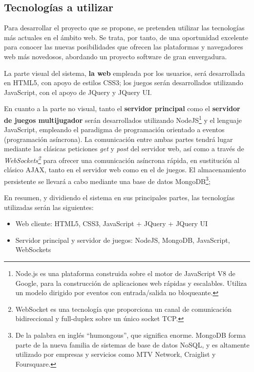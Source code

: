 \documentclass[12pt,a4paper]{article}
\begin{document}
\subsection{Tecnologías a utilizar}

Para desarrollar el proyecto que se propone, se pretenden utilizar las tecnologías más actuales en el ámbito web. Se trata, por tanto, de una oportunidad excelente para conocer las nuevas posibilidades que ofrecen las plataformas y navegadores web más novedosos, abordando un proyecto software de gran envergadura.

La parte visual del sistema, {\bf la web} empleada por los usuarios, será desarrollada en HTML5, con apoyo de estilos CSS3; los juegos serán desarrollados utilizando JavaScript, con el apoyo de JQuery y JQuery UI. 

En cuanto a la parte no visual, tanto el {\bf servidor principal} como el {\bf servidor de juegos multijugador} serán desarrollados utilizando NodeJS\footnote{Node.js es una plataforma construida sobre el motor de JavaScript V8 de Google, para la construcción de aplicaciones web rápidas y escalables. Utiliza un modelo dirigido por eventos con entrada/salida no bloqueante.} y el lenguaje JavaScript, empleando el paradigma de programación orientado a eventos (programación asíncrona). La comunicación entre ambas partes tendrá lugar mediante las clásicas peticiones {\it get} y {\it post} del servidor web, así como a través de {\it WebSockets\footnote{WebSocket es una tecnología que proporciona un canal de comunicación bidireccional y full-duplex sobre un único socket TCP.}} para ofrecer una comunicación asíncrona rápida, en sustitución al clásico AJAX, tanto en el servidor web como en el de juegos. El almacenamiento persistente se llevará a cabo mediante una base de datos MongoDB\footnote{De la palabra en inglés ``humongous'', que significa enorme. MongoDB forma parte de la nueva familia de sistemas de base de datos NoSQL, y es altamente utilizado por empresas y servicios como MTV Network, Craiglist y Foursquare.};

En resumen, y dividiendo el sistema en sus principales partes, las tecnologías utilizadas serán las siguientes:

\begin{itemize}
\item Web cliente: HTML5, CSS3, JavaScript + JQuery + JQuery UI
\item Servidor principal y servidor de juegos: NodeJS,  MongoDB, JavaScript, WebSockets
\end{itemize}
\end{document}
